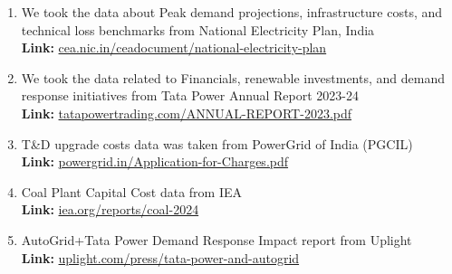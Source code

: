 \documentclass{article}
\begin{document}
\begin{enumerate}
    \item We took the data about Peak demand projections, infrastructure costs, and technical loss benchmarks from National Electricity Plan, India\\
    \textbf{Link:} \href{https://cea.nic.in/ceadocument/national-electricity-plan-vol-1-generation-notified-vide-extra-ordinary-gazette-no-1871-si-no-121-under-part-iii-section-iv-dated-28-03-2018/}{cea.nic.in/ceadocument/national-electricity-plan}
    
    \item We took the data related to Financials, renewable investments, and demand response initiatives from Tata Power Annual Report 2023-24\\
    \textbf{Link:} \href{https://tatapowertrading.com/wp-content/uploads/2023/11/ANNUAL-REPORT-2023.pdf}{tatapowertrading.com/ANNUAL-REPORT-2023.pdf}
    
    \item T\&D upgrade costs data was taken from PowerGrid of India (PGCIL)\\
    \textbf{Link:} \href{https://www.powergrid.in/sites/default/files/inline-files/Application-for-Charges.pdf}{powergrid.in/Application-for-Charges.pdf}
    
    \item Coal Plant Capital Cost data from IEA\\
    \textbf{Link:} \href{https://www.iea.org/reports/coal-2024}{iea.org/reports/coal-2024}
    
    \item AutoGrid+Tata Power Demand Response Impact report from Uplight\\
    \textbf{Link:} \href{https://uplight.com/press/tata-power-and-autogrid-expand-ai-enabled-smart-energy-management-in-mumbai-supporting-indias-net-zero-goals/}{uplight.com/press/tata-power-and-autogrid}
\end{enumerate}
\end{document}
